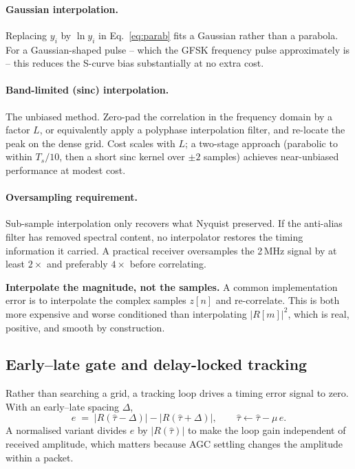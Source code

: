 \documentclass[11pt,a4paper]{article}
\begin{document}
\paragraph{Gaussian interpolation.} Replacing $y_i$ by $\ln y_i$ in Eq.~\eqref{eq:parab} fits a
Gaussian rather than a parabola. For a Gaussian-shaped pulse -- which the GFSK frequency pulse
approximately is -- this reduces the S-curve bias substantially at no extra cost.

\paragraph{Band-limited (sinc) interpolation.} The unbiased method. Zero-pad the correlation in the
frequency domain by a factor $L$, or equivalently apply a polyphase interpolation filter, and
re-locate the peak on the dense grid. Cost scales with $L$; a two-stage approach (parabolic to
within $T_s/10$, then a short sinc kernel over $\pm 2$ samples) achieves near-unbiased performance
at modest cost.

\paragraph{Oversampling requirement.} Sub-sample interpolation only recovers what Nyquist preserved.
If the anti-alias filter has removed spectral content, no interpolator restores the timing
information it carried. A practical receiver oversamples the 2\,MHz signal by at least $2\times$ and
preferably $4\times$ before correlating.

\begin{callout}
\textbf{Interpolate the magnitude, not the samples.} A common implementation error is to interpolate
the complex samples $z[n]$ and re-correlate. This is both more expensive and worse conditioned than
interpolating $|R[m]|^2$, which is real, positive, and smooth by construction.
\end{callout}

\subsection{Early--late gate and delay-locked tracking}
\label{sec:el}

Rather than searching a grid, a tracking loop drives a timing error signal to zero. With an
early--late spacing $\Delta$,
\begin{equation}
e \;=\; \bigl|R(\hat\tau - \Delta)\bigr| - \bigl|R(\hat\tau + \Delta)\bigr|,
\qquad
\hat\tau \leftarrow \hat\tau - \mu\, e .
\label{eq:el}
\end{equation}
A normalised variant divides $e$ by $|R(\hat\tau)|$ to make the loop gain independent of received
amplitude, which matters because AGC settling changes the amplitude within a packet.
\end{document}
